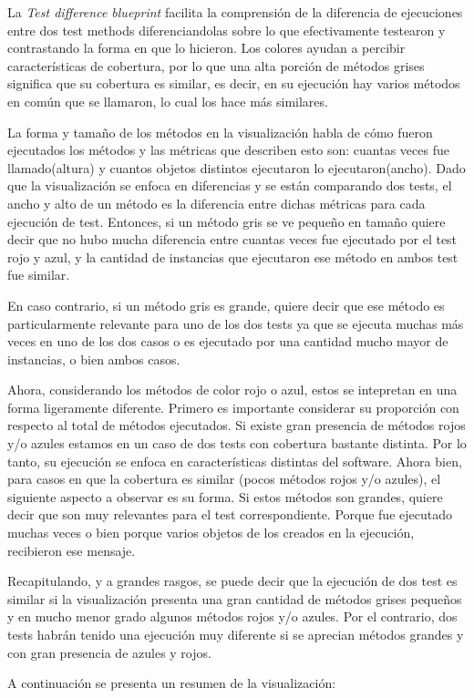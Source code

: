 \par La \emph{Test difference blueprint} facilita la comprensión de la diferencia de ejecuciones entre dos test methods diferenciandolas sobre lo que efectivamente testearon y contrastando la forma en que lo hicieron. Los colores ayudan a percibir características de cobertura, por lo que una alta porción de métodos grises significa que su cobertura es similar, es decir, en su ejecución hay varios métodos en común que se llamaron, lo cual los hace más similares.

\par La forma y tamaño de los métodos en la visualización habla de cómo fueron ejecutados los métodos y las métricas que describen esto son: cuantas veces fue llamado(altura) y cuantos objetos distintos ejecutaron lo ejecutaron(ancho). Dado que la visualización se enfoca en diferencias y se están comparando dos tests, el ancho y alto de un método es la diferencia entre dichas métricas para cada ejecución de test. Entonces, si un método gris se ve pequeño en tamaño quiere decir que no hubo mucha diferencia entre cuantas veces fue ejecutado por el test rojo y azul, y la cantidad de instancias que ejecutaron ese método en ambos test fue similar. 

\par En caso contrario, si un método gris es grande, quiere decir que ese método es particularmente relevante para uno de los dos tests ya que se ejecuta muchas más veces en uno de los dos casos o es ejecutado por una cantidad mucho mayor de instancias, o bien ambos casos. 

\par Ahora, considerando los métodos de color rojo o azul, estos se intepretan en una forma ligeramente diferente. Primero es importante considerar su proporción con respecto al total de métodos ejecutados. Si existe gran presencia de métodos rojos y/o azules estamos en un caso de dos tests con cobertura bastante distinta. Por lo tanto, su ejecución se enfoca en características distintas del software. Ahora bien, para casos en que la cobertura es similar (pocos métodos rojos y/o azules), el siguiente aspecto a observar es su forma. Si estos métodos son grandes, quiere decir que son muy relevantes para el test correspondiente. Porque fue ejecutado muchas veces o bien porque varios objetos de los creados en la ejecución, recibieron ese mensaje.

\par Recapitulando, y a grandes rasgos, se puede decir que la ejecución de dos test es similar si la visualización presenta una gran cantidad de métodos grises pequeños y en mucho menor grado algunos métodos rojos y/o azules. Por el contrario, dos tests habrán tenido una ejecución muy diferente si se aprecian métodos grandes y con gran presencia de azules y rojos. 

\par A continuación se presenta un resumen de la visualización:

